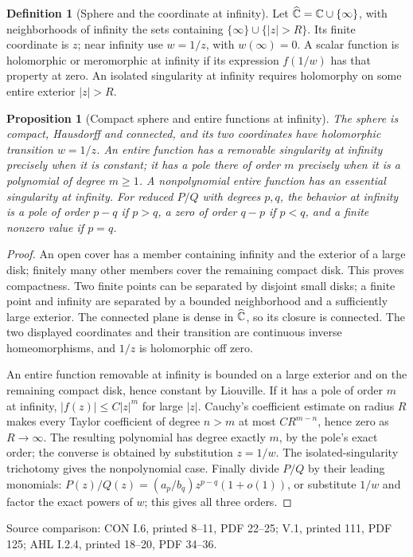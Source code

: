 \documentclass[11pt,a4paper,openany]{book}
\newtheorem{proposition}[theorem]{Proposition}
\theoremstyle{definition}
\newtheorem{definition}[theorem]{Definition}
\theoremstyle{remark}\newtheorem{remark}[theorem]{Remark}
\newcommand{\family}[1]{}
\newcommand{\source}[1]{\par\begingroup\small\sffamily\color{black!65}Source comparison: #1\par\endgroup}
\begin{document}
\begin{definition}[Sphere and the coordinate at infinity]\family{D12.07.05}\label{d12:07-05}
Let \(\widehat{\mathbb C}=\mathbb C\cup\{\infty\}\), with neighborhoods of infinity the sets
containing \(\{\infty\}\cup\{|z|>R\}\).
Its finite coordinate is \(z\); near infinity use \(w=1/z\), with
\(w(\infty)=0\). A scalar function is holomorphic or meromorphic at
infinity if its expression \(f(1/w)\) has that property at zero.
An isolated singularity at infinity requires holomorphy on some entire
exterior \(|z|>R\).
\end{definition}
\begin{proposition}[Compact sphere and entire functions at infinity]\label{d12:07-05-classification}
The sphere is compact, Hausdorff and connected, and its two coordinates
have holomorphic transition \(w=1/z\).
An entire function has a removable singularity at infinity precisely
when it is constant; it has a pole there of order \(m\) precisely when
it is a polynomial of degree \(m\ge1\). A nonpolynomial entire function
has an essential singularity at infinity.
For reduced \(P/Q\) with degrees \(p,q\), the behavior at infinity is
a pole of order \(p-q\) if \(p>q\), a zero of order \(q-p\) if \(p<q\),
and a finite nonzero value if \(p=q\).
\end{proposition}
\begin{proof}
An open cover has a member containing infinity and the exterior of a
large disk; finitely many other members cover the remaining compact
disk. This proves compactness. Two finite points can be separated by
disjoint small disks; a finite point and infinity are separated by a
bounded neighborhood and a sufficiently large exterior.
The connected plane is dense in \(\widehat{\mathbb C}\), so its closure is connected.
The two displayed coordinates and their transition are continuous
inverse homeomorphisms, and \(1/z\) is holomorphic off zero.

An entire function removable at infinity is bounded on a large exterior
and on the remaining compact disk, hence constant by Liouville.
If it has a pole of order \(m\) at infinity, \(|f(z)|\le C|z|^m\)
for large \(|z|\). Cauchy's coefficient estimate on radius \(R\) makes
every Taylor coefficient of degree \(n>m\) at most \(CR^{m-n}\),
hence zero as \(R\to\infty\). The resulting polynomial has degree
exactly \(m\), by the pole's exact order; the converse is obtained by
substitution \(z=1/w\).
The isolated-singularity trichotomy gives the nonpolynomial case.
Finally divide \(P/Q\) by their leading monomials:
\(P(z)/Q(z)=(a_p/b_q)z^{p-q}(1+o(1))\), or substitute \(1/w\)
and factor the exact powers of \(w\); this gives all three orders.
\end{proof}
\source{CON I.6, printed 8--11, PDF 22--25; V.1, printed 111, PDF 125; AHL I.2.4, printed 18--20, PDF 34--36.}
\end{document}
